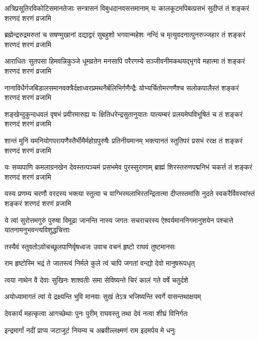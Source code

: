 \twolineshloka
{अत्रिप्रसूतिरविकोटिसमानतेजाः सन्त्रासनं विबुधदानवसत्तमानाम्}
{यः कालकूटमपिबत्प्रसभं सुदीप्तं तं शङ्करं शरणदं शरणं व्रजामि} %

\twolineshloka
{ब्रह्मेन्द्ररुद्रमरुतां च सषण्मुखानां दद्याद्वरं सुबहुशो भगवान्महेशः}
{नन्दिं च मृत्युवदनात्पुनरुज्जहार तं शङ्करं शरणदं शरणं व्रजामि} %

\twolineshloka
{आराधितः सुतपसा हिमवन्निकुञ्जे धूमव्रतेन मनसापि परैरगम्ये}
{सञ्जीवनीमकथयद्भृगवे महात्मा तं शङ्करं शरणदं शरणं व्रजामि} %

\twolineshloka
{नानाविधैर्गजबिडालसमानवक्त्रैर्दक्षाध्वरप्रमथनैर्बलिभिर्गणैन्द्रैः }
{योभ्यर्चितोमरगणैश्च सलोकपालैस्तं शङ्करं शरणदं शरणं व्रजामि} %

\twolineshloka
{शङ्खेन्दुकुन्दधवलं वृषभं प्रवीरमारुह्य यः क्षितिधरेन्द्रसुतानुयातः}
{यात्यम्बरं प्रलयमेघविभूषितं च तं शङ्करं शरणदं शरणं व्रजामि} %

\twolineshloka
{शान्तं मुनिं यमनियोगपरायणैस्तैर्भीमैर्महोग्रपुरुषैः प्रतिनीयमानम्}
{भक्त्यानतं स्तुतिपरं प्रसभं ररक्ष तं शङ्करं शरणदं शरणं व्रजामि} %

\twolineshloka
{यः सव्यपाणि कमलाग्रनखेन देवस्तत्पञ्चमं प्रसभमेव पुरस्सुराणाम्}
{ब्राह्मं शिरस्तरुणपद्मनिभं चकर्त्त तं शङ्करं शरणदं शरणं व्रजामि} %

\twolineshloka
{यस्य प्रणम्य चरणौ वरदस्य भक्त्या स्तुत्वा च वाग्भिरमलाभिरतन्द्रितात्मा}
{दीप्तस्तमांसि नुदते स्वकरैर्विवस्वांस्तं शङ्करं शरणदं शरणं व्रजामि} %

\twolineshloka
{ये त्वां सुरोत्तमगुरुं पुरुषा विमूढा जानन्ति नास्य जगतः सचराचरस्य}
{ऐश्वर्यमाननिगमानुशयेन पश्चात्ते यातनामनुभवन्त्यविशुद्धचित्ताः} %

\twolineshloka
{तस्यैवं स्तुवतोऽवोचच्छूलपाणिर्वृषध्वजः}
{उवाच वचनं हृष्टो राघवं तुष्टमानसः} %

\twolineshloka
{राम हृष्टोस्मि भद्रं ते जातस्त्वं निर्मले कुले}
{त्वं चापि जगतां वन्द्यो देवो मानुषरूपधृत्} %

\twolineshloka
{त्वया नाथेन वै देवाः सुखिनः शाश्वतीः समा}
{सेविष्यन्ते चिरं कालं गते वर्षे चतुर्दशे} %

\twolineshloka
{अयोध्यामागतं त्वां ये द्रक्ष्यन्ति भुवि मानवाः}
{सुखं तेऽत्र भजिष्यन्ति स्वर्गे वासन्तथाक्षयम्} %

\twolineshloka
{देवकार्यं महत्कृत्वा आगच्छेथाः पुनः पुरीम्}
{राघवस्तु तथा देवं नत्वा शीघ्रं विनिर्गतः} %

\twolineshloka
{इन्द्रमार्गां नदीं प्राप्य जटाजूटं नियम्य च}
{अब्रवील्लक्ष्मणं राम इदमर्पय मे धनुः} %

